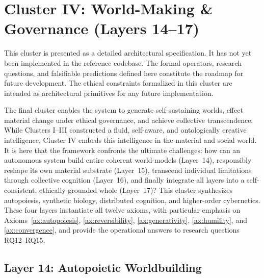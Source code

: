\section{Cluster IV: World-Making \& Governance (Layers 14--17)}
\label{sec:cluster4}

\begin{tcolorbox}[colback=gray!10, colframe=gray!50, title=Status: Architectural Specification]
This cluster is presented as a detailed architectural specification. It has not yet been implemented in the reference codebase. The formal operators, research questions, and falsifiable predictions defined here constitute the roadmap for future development. The ethical constraints formalized in this cluster are intended as architectural primitives for any future implementation.
\end{tcolorbox}

The final cluster enables the system to generate self-sustaining worlds, effect material change under ethical governance, and achieve collective transcendence. While Clusters I--III constructed a fluid, self-aware, and ontologically creative intelligence, Cluster IV embeds this intelligence in the material and social world. It is here that the framework confronts the ultimate challenges: how can an autonomous system build entire coherent world-models (Layer~14), responsibly reshape its own material substrate (Layer~15), transcend individual limitations through collective cognition (Layer~16), and finally integrate all layers into a self-consistent, ethically grounded whole (Layer~17)? This cluster synthesizes autopoiesis, synthetic biology, distributed cognition, and higher-order cybernetics. These four layers instantiate all twelve axioms, with particular emphasis on Axioms~\ref{ax:autopoiesis}, \ref{ax:reversibility}, \ref{ax:generativity}, \ref{ax:humility}, and \ref{ax:convergence}, and provide the operational answers to research questions RQ12--RQ15.

\subsection{Layer 14: Autopoietic Worldbuilding}
\label{subsec:layer14}

